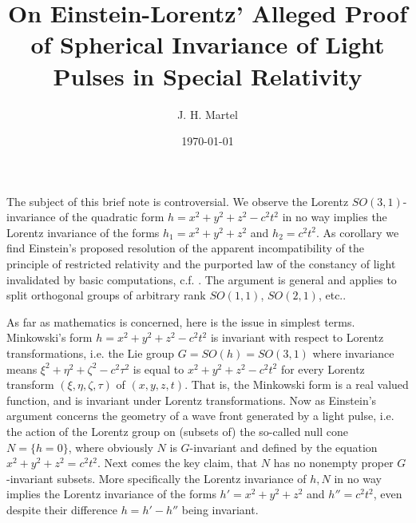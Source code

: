 \documentclass[12pt]{amsart}
\theoremstyle{definition}
\theoremstyle{remark}
\newcommand{\del}{\partial}
\begin{document}
\title{On Einstein-Lorentz' Alleged Proof of Spherical Invariance of Light Pulses in Special Relativity}
\author{J. H. Martel}
\date{\today}

\maketitle

The subject of this brief note is controversial. We observe the Lorentz $SO(3,1)$-invariance of the quadratic form $h=x^2+y^2+z^2-c^2t^2$ in no way implies the Lorentz invariance of the forms $h_1=x^2+y^2+z^2$ and $h_2=c^2 t^2$. As corollary we find Einstein's proposed resolution of the apparent incompatibility of the principle of restricted relativity and the purported law of the constancy of light invalidated by basic computations, c.f. \cite[Ch.7, 11]{einstein2019relativity}. The argument is general and applies to split orthogonal groups of arbitrary rank $SO(1,1)$, $SO(2,1)$, etc.. %

As far as mathematics is concerned, here is the issue in simplest terms. Minkowski's form $h=x^2+y^2+z^2-c^2t^2$ is invariant with respect to Lorentz transformations, i.e. the Lie group $G=SO(h)=SO(3,1)$ where invariance means $\xi^2+\eta^2+\zeta^2-c^2 \tau^2$ is equal to $x^2+y^2+z^2-c^2 t^2$ for every Lorentz transform $(\xi, \eta, \zeta, \tau)$ of $(x,y,z,t)$. That is, the Minkowski form is a real valued function, and is invariant under Lorentz transformations. Now as Einstein's argument concerns the geometry of a wave front generated by a light pulse, i.e. the action of the Lorentz group on (subsets of) the so-called null cone $N=\{h=0\}$, where obviously $N$ is $G$-invariant and defined by the equation $x^2+y^2+z^2=c^2 t^2$. Next comes the key claim, that $N$ has no nonempty proper $G$-invariant subsets. More specifically the Lorentz invariance of $h, N$ in no way implies the Lorentz invariance of the forms $h'=x^2+y^2+z^2$ and $h''=c^2 t^2$, even despite their difference $h=h'-h''$ being invariant. 
\end{document}
